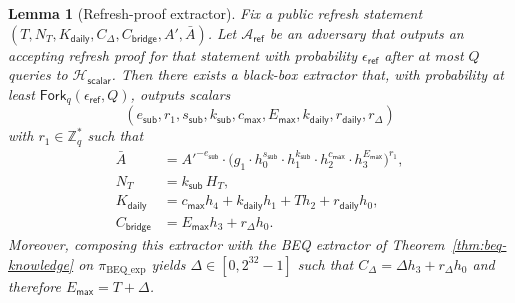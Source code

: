 \documentclass[11pt]{article}
\theoremstyle{definitionstyle}
\newtheorem{lemma}[theorem]{Lemma}
\theoremstyle{plain}
\begin{document}
\begin{lemma}[Refresh-proof extractor]
\label{lem:refresh-extractor}
Fix a public refresh statement $(T,N_T,K_{\mathsf{daily}},C_{\Delta},C_{\mathsf{bridge}},A',\bar{A})$. Let $\mathcal{A}_{\mathsf{ref}}$ be an adversary that outputs an accepting refresh proof for that statement with probability $\epsilon_{\mathsf{ref}}$ after at most $Q$ queries to $\mathcal{H}_{\mathsf{scalar}}$. Then there exists a black-box extractor that, with probability at least $\mathsf{Fork}_q(\epsilon_{\mathsf{ref}},Q)$, outputs scalars
\[
(e_{\mathsf{sub}}, r_1, s_{\mathsf{sub}}, k_{\mathsf{sub}}, c_{\mathsf{max}}, E_{\mathsf{max}}, k_{\mathsf{daily}}, r_{\mathsf{daily}}, r_{\Delta})
\]
with $r_1 \in \mathbb{Z}_q^*$ such that
\begin{align*}
\bar{A} &= A'^{-e_{\mathsf{sub}}}\!\cdot \bigl(g_1\cdot h_0^{s_{\mathsf{sub}}}\cdot h_1^{k_{\mathsf{sub}}}\cdot h_2^{c_{\mathsf{max}}}\cdot h_3^{E_{\mathsf{max}}}\bigr)^{r_1},\\
N_T &= k_{\mathsf{sub}}\, H_T,\\
K_{\mathsf{daily}} &= c_{\mathsf{max}} h_4 + k_{\mathsf{daily}} h_1 + T h_2 + r_{\mathsf{daily}} h_0,\\
C_{\mathsf{bridge}} &= E_{\mathsf{max}} h_3 + r_{\Delta} h_0.
\end{align*}
Moreover, composing this extractor with the BEQ extractor of Theorem~\ref{thm:beq-knowledge} on $\pi_{\text{BEQ\_exp}}$ yields $\Delta \in [0,2^{32}-1]$ such that $C_{\Delta} = \Delta h_3 + r_{\Delta} h_0$ and therefore $E_{\mathsf{max}} = T+\Delta$.
\end{lemma}
\end{document}
